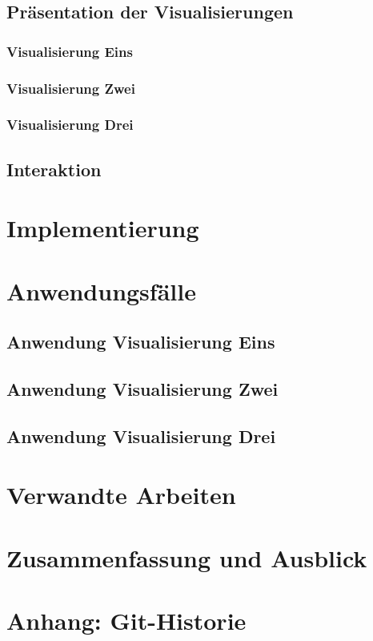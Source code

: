 \documentclass[usegeometry=true]{scrartcl}
\begin{document}
\subsection{Präsentation der Visualisierungen} 
\subsubsection{Visualisierung Eins}
\subsubsection{Visualisierung Zwei}
\subsubsection{Visualisierung Drei}
\subsection{Interaktion}
\section{Implementierung}
\section{Anwendungsfälle}
\subsection{Anwendung Visualisierung Eins}
\subsection{Anwendung Visualisierung Zwei}
\subsection{Anwendung Visualisierung Drei}
\section{Verwandte Arbeiten}
\section{Zusammenfassung und Ausblick}
\section*{Anhang: Git-Historie}

\printbibliography
\end{document}
